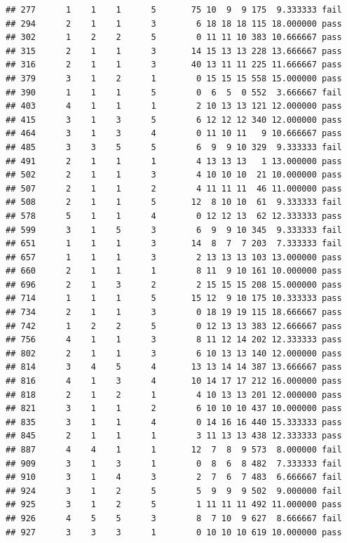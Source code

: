 \documentclass[]{article}
\begin{document}
\begin{verbatim}
## 277      1    1    1      5       75 10  9  9 175  9.333333 fail
## 294      2    1    1      3        6 18 18 18 115 18.000000 pass
## 302      1    2    2      5        0 11 11 10 383 10.666667 pass
## 315      2    1    1      3       14 15 13 13 228 13.666667 pass
## 316      2    1    1      3       40 13 11 11 225 11.666667 pass
## 379      3    1    2      1        0 15 15 15 558 15.000000 pass
## 390      1    1    1      5        0  6  5  0 552  3.666667 fail
## 403      4    1    1      1        2 10 13 13 121 12.000000 pass
## 415      3    1    3      5        6 12 12 12 340 12.000000 pass
## 464      3    1    3      4        0 11 10 11   9 10.666667 pass
## 485      3    3    5      5        6  9  9 10 329  9.333333 fail
## 491      2    1    1      1        4 13 13 13   1 13.000000 pass
## 502      2    1    1      3        4 10 10 10  21 10.000000 pass
## 507      2    1    1      2        4 11 11 11  46 11.000000 pass
## 508      2    1    1      5       12  8 10 10  61  9.333333 fail
## 578      5    1    1      4        0 12 12 13  62 12.333333 pass
## 599      3    1    5      3        6  9  9 10 345  9.333333 fail
## 651      1    1    1      3       14  8  7  7 203  7.333333 fail
## 657      1    1    1      3        2 13 13 13 103 13.000000 pass
## 660      2    1    1      1        8 11  9 10 161 10.000000 pass
## 696      2    1    3      2        2 15 15 15 208 15.000000 pass
## 714      1    1    1      5       15 12  9 10 175 10.333333 pass
## 734      2    1    1      3        0 18 19 19 115 18.666667 pass
## 742      1    2    2      5        0 12 13 13 383 12.666667 pass
## 756      4    1    1      3        8 11 12 14 202 12.333333 pass
## 802      2    1    1      3        6 10 13 13 140 12.000000 pass
## 814      3    4    5      4       13 13 14 14 387 13.666667 pass
## 816      4    1    3      4       10 14 17 17 212 16.000000 pass
## 818      2    1    2      1        4 10 13 13 201 12.000000 pass
## 821      3    1    1      2        6 10 10 10 437 10.000000 pass
## 835      3    1    1      4        0 14 16 16 440 15.333333 pass
## 845      2    1    1      1        3 11 13 13 438 12.333333 pass
## 887      4    4    1      1       12  7  8  9 573  8.000000 fail
## 909      3    1    3      1        0  8  6  8 482  7.333333 fail
## 910      3    1    4      3        2  7  6  7 483  6.666667 fail
## 924      3    1    2      5        5  9  9  9 502  9.000000 fail
## 925      3    1    2      5        1 11 11 11 492 11.000000 pass
## 926      4    5    5      3        8  7 10  9 627  8.666667 fail
## 927      3    3    3      1        0 10 10 10 619 10.000000 pass

\end{verbatim}
\end{document}
